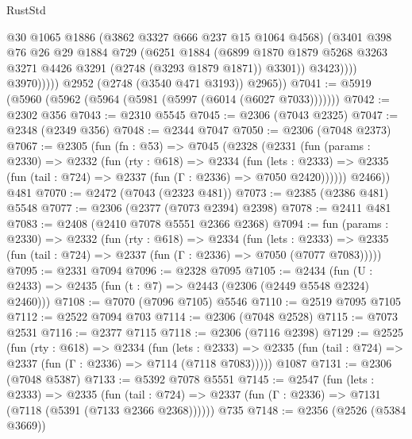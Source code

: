\begin{lexlean}{RustStd}
\begin{coremodule}
                        @30
                        @1065
                        @1886
                        (@3862 @3327 @666 @237 @15 @1064 @4568)
                        (@3401
                          @398
                          @76
                          @26
                          @29
                          @1884
                          @729
                          (@6251
                            @1884
                            (@6899
                              @1870
                              @1879
                              @5268
                              @3263
                              @3271
                              @4426
                              @3291
                              (@2748 (@3293 @1879 @1871))
                              @3301))
                          @3423))))
                  @3970)))))
        @2952
        (@2748 (@3540 @471 @3193))
        @2965))
@7041 := @5919 (@5960 (@5962 (@5964 (@5981 (@5997 (@6014 (@6027 @7033)))))))
@7042 := @2302 @356
@7043 := @2310 @5545
@7045 := @2306 (@7043 @2325)
@7047 := @2348 (@2349 @356)
@7048 := @2344 @7047
@7050 := @2306 (@7048 @2373)
@7067 := @2305
    (fun (fn : @53) =>
    @7045
      (@2328
        (@2331
          (fun (params : @2330) =>
          @2332
            (fun (rty : @618) =>
            @2334
              (fun (lets : @2333) =>
              @2335 (fun (tail : @724) => @2337 (fun (Γ : @2336) => @7050 @2420))))))
        @2466))
    @481
@7070 := @2472 (@7043 (@2323 @481))
@7073 := @2385 (@2386 @481) @5548
@7077 := @2306 (@2377 (@7073 @2394) @2398)
@7078 := @2411 @481
@7083 := @2408 (@2410 @7078 @5551 @2366 @2368)
@7094 := fun (params : @2330) =>
  @2332
    (fun (rty : @618) =>
    @2334
      (fun (lets : @2333) =>
      @2335 (fun (tail : @724) => @2337 (fun (Γ : @2336) => @7050 (@7077 @7083)))))
@7095 := @2331 @7094
@7096 := @2328 @7095
@7105 := @2434 (fun (U : @2433) => @2435 (fun (t : @7) => @2443 (@2306 (@2449 @5548 @2324) @2460)))
@7108 := @7070 (@7096 @7105) @5546
@7110 := @2519 @7095 @7105
@7112 := @2522 @7094 @703
@7114 := @2306 (@7048 @2528)
@7115 := @7073 @2531
@7116 := @2377 @7115
@7118 := @2306 (@7116 @2398)
@7129 := @2525
    (fun (rty : @618) =>
    @2334
      (fun (lets : @2333) =>
      @2335 (fun (tail : @724) => @2337 (fun (Γ : @2336) => @7114 (@7118 @7083)))))
    @1087
@7131 := @2306 (@7048 @5387)
@7133 := @5392 @7078 @5551
@7145 := @2547
    (fun (lets : @2333) =>
    @2335
      (fun (tail : @724) => @2337 (fun (Γ : @2336) => @7131 (@7118 (@5391 (@7133 @2366 @2368))))))
    @735
@7148 := @2356 (@2526 (@5384 @3669))

\end{coremodule}
\end{lexlean}
